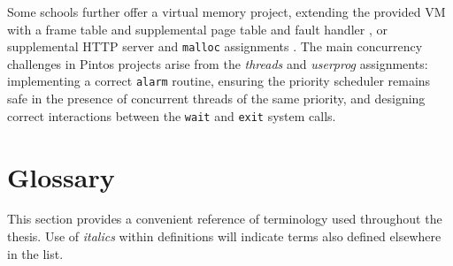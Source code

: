 Some schools further offer a virtual memory project, extending the provided VM with a frame table and supplemental page table and fault handler \cite{standford-cs140,uchicago-cs230}, or supplemental HTTP server and {\tt malloc} assignments \cite{berkeley-cs162}.
The main concurrency challenges in Pintos projects arise from the {\em threads} and {\em userprog} assignments:
implementing a correct {\tt alarm} routine,
ensuring the priority scheduler remains safe in the presence of concurrent threads of the same priority,
and designing correct interactions between the {\tt wait} and {\tt exit} system calls.

\section{Glossary}
\label{sec:glossary}

This section provides a convenient reference of terminology used throughout the thesis.
Use of {\em italics} within definitions will indicate terms also defined elsewhere in the list.

